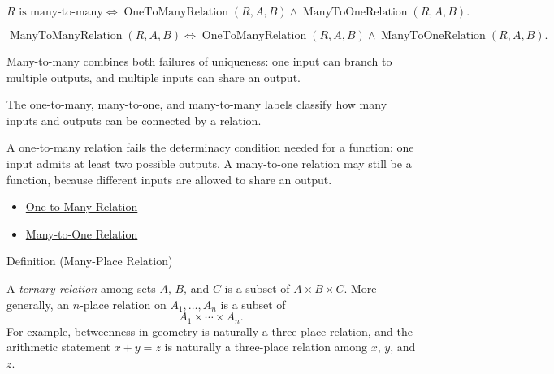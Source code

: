 \begin{remark*}
\[
  R \text{ is many-to-many}
  \iff
  \operatorname{OneToManyRelation}(R,A,B)
  \wedge
  \operatorname{ManyToOneRelation}(R,A,B).
\]
\end{remark*}

\begin{remark*}
\[
  \operatorname{ManyToManyRelation}(R,A,B)
  \iff
  \operatorname{OneToManyRelation}(R,A,B)
  \wedge
  \operatorname{ManyToOneRelation}(R,A,B).
\]
\end{remark*}

\begin{remark*}[Interpretation]
Many-to-many combines both failures of uniqueness: one input can branch to
multiple outputs, and multiple inputs can share an output.
\end{remark*}

\begin{remark*}[Exposition]
The one-to-many, many-to-one, and many-to-many labels classify how many inputs
and outputs can be connected by a relation.
\end{remark*}

\begin{remark*}[Exposition]
A one-to-many relation fails the determinacy condition needed for a function:
one input admits at least two possible outputs. A many-to-one relation may
still be a function, because different inputs are allowed to share an output.
\end{remark*}

\begin{dependencies}
\begin{itemize}
  \item \hyperref[def:one-to-many-relation]{One-to-Many Relation}
  \item \hyperref[def:many-to-one-relation]{Many-to-One Relation}
\end{itemize}
\end{dependencies}

\begin{definitionbox}{Definition (Many-Place Relation)}
\begin{definition}\label{def:many-place-relation}
A \emph{ternary relation} among sets $A$, $B$, and $C$ is a subset of
$A\times B\times C$. More generally, an $n$-place relation on
$A_1,\ldots,A_n$ is a subset of
\[
A_1\times\cdots\times A_n.
\]
For example, betweenness in geometry is naturally a three-place relation, and
the arithmetic statement $x+y=z$ is naturally a three-place relation among
$x$, $y$, and $z$.
\end{definition}
\end{definitionbox}

